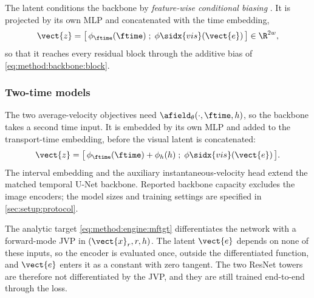 The latent conditions the backbone by \emph{feature-wise conditional biasing}
\parencite[Sec.~3]{perez2017film}. It is projected by its own MLP and concatenated with the time
embedding,
\begin{equation}\label{eq:method:backbone:concat}
  \vect{z} = \big[\,\phi_{\ftime}(\ftime)\;;\;\phi\sidx{vis}(\vect{e})\,\big] \in \R^{2w},
\end{equation}
so that it reaches every residual block through the additive bias of
\eqref{eq:method:backbone:block}.

\subsubsection*{Two-time models}

The two average-velocity objectives need $\afield_{\theta}(\cdot,\ftime,h)$, so the backbone takes a
second time input. It is embedded by its own MLP and added to the transport-time embedding, before
the visual latent is concatenated:
\begin{equation}\label{eq:method:backbone:twotime}
  \vect{z} = \big[\,\phi_{\ftime}(\ftime) + \phi_{h}(h)\;;\;\phi\sidx{vis}(\vect{e})\,\big].
\end{equation}
The interval embedding and the auxiliary instantaneous-velocity head extend the matched temporal
U-Net backbone. Reported backbone capacity excludes the image encoders; the model sizes and training
settings are specified in \autoref{sec:setup:protocol}.

The analytic target \eqref{eq:method:engine:mftgt} differentiates the network with a forward-mode
\ac{JVP} in $(\vect{x}_{r},r,h)$. The latent $\vect{e}$ depends on none of these inputs, so the encoder
is evaluated once, outside the differentiated function, and $\vect{e}$ enters it as a constant with
zero tangent. The two ResNet towers are therefore not differentiated by the \ac{JVP}, and they are
still trained end-to-end through the loss.

